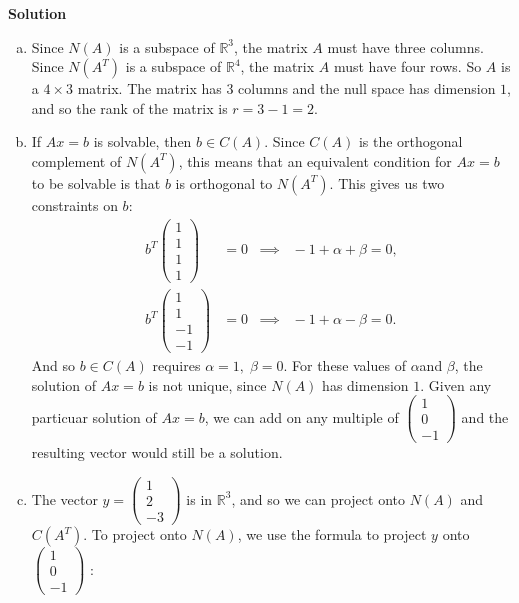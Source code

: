 \documentclass[11pt]{article}
\begin{document}
\noindent \textbf{Solution}\\
\begin{enumerate}[(a)]
\item Since $N(A)$ is a subspace of $\mathbb{R}^{3}$, the matrix $A$
must have three columns. Since $N(A^{T})$ is a subspace of $\mathbb{R}^{4}$,
the matrix $A$ must have four rows. So $A$ is a $4\times3$ matrix.
The matrix has 3 columns and the null space has dimension $1$, and
so the rank of the matrix is $r=3-1=2$. 
\item If $Ax=b$ is solvable, then $b\in C(A)$. Since $C(A)$ is the orthogonal
complement of $N(A^{T})$, this means that an equivalent condition
for $Ax=b$ to be solvable is that $b$ is orthogonal to $N(A^{T})$.
This gives us two constraints on $b$:
\begin{align*}
b^{T}\begin{pmatrix}1\\
1\\
1\\
1
\end{pmatrix} & =0\;\;\implies\;\;-1+\alpha+\beta=0,\\
b^{T}\begin{pmatrix}1\\
1\\
-1\\
-1
\end{pmatrix} & =0\;\;\implies\;\;-1+\alpha-\beta=0.
\end{align*}
And so $b\in C(A)$ requires $\alpha=1,\;\beta=0$. For these values
of $\alpha$and $\beta$, the solution of $Ax=b$ is not unique, since
$N(A)$ has dimension $1$. Given any particuar solution of $Ax=b$,
we can add on any multiple of $\begin{pmatrix}1\\
0\\
-1
\end{pmatrix}$ and the resulting vector would still be a solution. 
\item The vector $y=\left(\begin{array}{c}
1\\
2\\
-3
\end{array}\right)$ is in $\mathbb{\mathbb{{R}}}^{3}$, and so we can project onto $N(A)$
and $C(A^{T})$. To project onto $N(A)$, we use the formula to project
$y$ onto $\begin{pmatrix}1\\
0\\
-1
\end{pmatrix}$ :

\end{enumerate}
\end{document}

